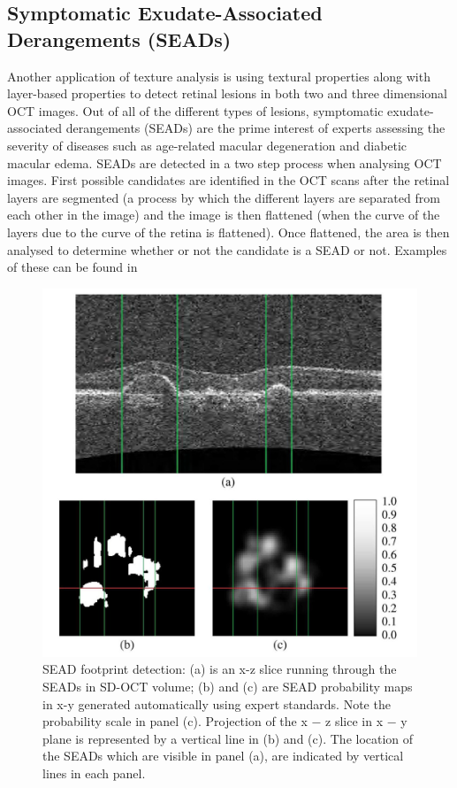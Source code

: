 \subsection{Symptomatic Exudate-Associated Derangements (SEADs)}
Another application of texture analysis is using textural properties along with
layer-based properties to detect retinal lesions in both two and three dimensional
OCT images. Out of all of the different types of lesions, symptomatic exudate-associated derangements (SEADs) are the prime interest of
experts assessing the severity of diseases such as age-related macular degeneration and diabetic macular edema.  SEADs are detected in a two step process when analysing OCT images.  First possible candidates are identified in the OCT scans after the retinal layers are segmented (a process by which the different layers are separated from each other in the image) and the image is then flattened (when the curve of the layers due to the curve of the retina is flattened).  Once flattened, the area is then analysed to determine whether or not the candidate is a SEAD or not. 
\cite{mbib_4} Examples of these can be found in 

\begin{figure}[htbp]
\centering
\includegraphics{figures/morgan_7}
\caption{SEAD footprint detection: (a) is an x-z slice running through the SEADs in SD-OCT volume; (b) and (c) are SEAD probability maps in x-y generated automatically using expert standards.  Note the probability scale in panel (c). Projection of the x − z slice in x − y plane is represented by a vertical line in (b) and (c). The location of the SEADs which are visible in panel (a), are indicated by vertical lines in each panel. \cite{mbib_4} }
\label{fig:m_7}
\end{figure}

